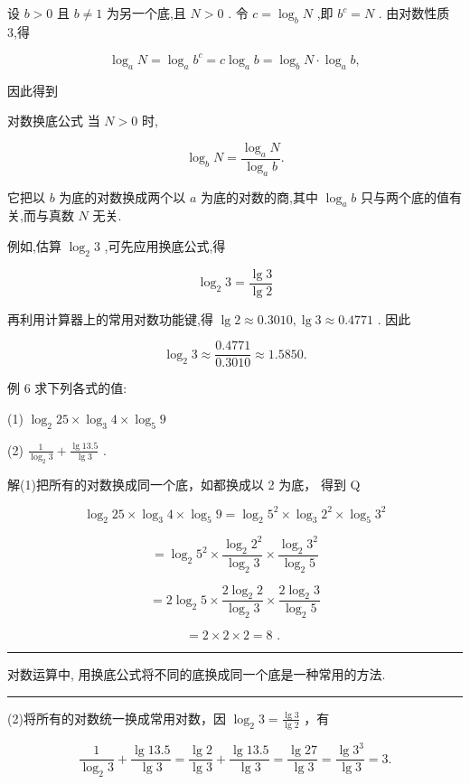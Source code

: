 \documentclass[10pt]{article}
\newcommand{\HRule}{\begin{center}\rule{0.9\linewidth}{0.2mm}\end{center}}
\begin{document}
设 \(b > 0\) 且 \(b \neq  1\) 为另一个底,且 \(N > 0\) . 令 \(c = {\log }_{b}N\) ,即 \({b}^{c} = N\) . 由对数性质 3,得

\[
{\log }_{a}N = {\log }_{a}{b}^{c} = c{\log }_{a}b = {\log }_{b}N \cdot  {\log }_{a}b,
\]

因此得到

对数换底公式 当 \(N > 0\) 时,

\[
{\log }_{b}N = \frac{{\log }_{a}N}{{\log }_{a}b}.
\]

它把以 \(b\) 为底的对数换成两个以 \(a\) 为底的对数的商,其中 \({\log }_{a}b\) 只与两个底的值有关,而与真数 \(N\) 无关.

例如,估算 \({\log }_{2}3\) ,可先应用换底公式,得

\[
{\log }_{2}3 = \frac{\lg 3}{\lg 2}
\]

再利用计算器上的常用对数功能键,得 \(\lg 2 \approx  {0.3010},\lg 3 \approx  {0.4771}\) . 因此

\[
{\log }_{2}3 \approx  \frac{0.4771}{0.3010} \approx  {1.5850}.
\]





例 6 求下列各式的值:

(1) \({\log }_{2}{25} \times  {\log }_{3}4 \times  {\log }_{5}9\)

(2) \(\frac{1}{{\log }_{2}3} + \frac{\lg {13.5}}{\lg 3}\) .

解(1)把所有的对数换成同一个底，如都换成以 2 为底， 得到 Q

\[
{\log }_{2}{25} \times  {\log }_{3}4 \times  {\log }_{5}9 = {\log }_{2}{5}^{2} \times  {\log }_{3}{2}^{2} \times  {\log }_{5}{3}^{2}
\]

\[
= {\log }_{2}{5}^{2} \times  \frac{{\log }_{2}{2}^{2}}{{\log }_{2}3} \times  \frac{{\log }_{2}{3}^{2}}{{\log }_{2}5}
\]

\[
= 2{\log }_{2}5 \times  \frac{2{\log }_{2}2}{{\log }_{2}3} \times  \frac{2{\log }_{2}3}{{\log }_{2}5}
\]

\[
= 2 \times  2 \times  2 = 8\text{ . }
\]

\HRule

对数运算中, 用换底公式将不同的底换成同一个底是一种常用的方法.

\HRule

(2)将所有的对数统一换成常用对数，因 \({\log }_{2}3 = \frac{\lg 3}{\lg 2}\) ，有

\[
\frac{1}{{\log }_{2}3} + \frac{\lg {13.5}}{\lg 3} = \frac{\lg 2}{\lg 3} + \frac{\lg {13.5}}{\lg 3} = \frac{\lg {27}}{\lg 3} = \frac{\lg {3}^{3}}{\lg 3} = 3.
\]
\end{document}
